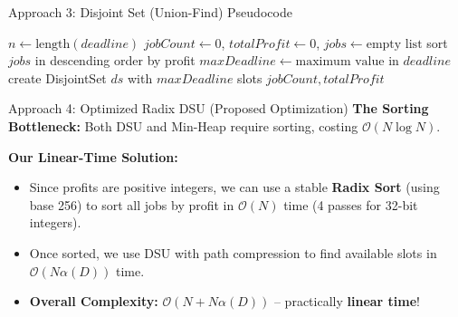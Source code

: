 \documentclass[aspectratio=169]{beamer}
\begin{document}
\begin{frame}{Approach 3: Disjoint Set (Union-Find) Pseudocode}
    \begin{algorithm}[H]
    \scriptsize
    \caption{DSU Greedy}
    \SetAlgoLined
    $n \leftarrow \text{length}(deadline)$\;
    $jobCount \leftarrow 0$, $totalProfit \leftarrow 0$, $jobs \leftarrow \text{empty list}$\;
    sort $jobs$ in descending order by profit\;
    $maxDeadline \leftarrow \text{maximum value in } deadline$\;
    create DisjointSet $ds$ with $maxDeadline$ slots\;
    \Return $jobCount, totalProfit$\;
    \end{algorithm}
\end{frame}

\begin{frame}{Approach 4: Optimized Radix DSU (Proposed Optimization)}
    \textbf{The Sorting Bottleneck:}
    Both DSU and Min-Heap require sorting, costing $\mathcal{O}(N \log N)$.
    \vspace{0.3cm}

    \textbf{Our Linear-Time Solution:}
    \begin{itemize}
        \item Since profits are positive integers, we can use a stable \textbf{Radix Sort} (using base 256) to sort all jobs by profit in $\mathcal{O}(N)$ time (4 passes for 32-bit integers).
        \item Once sorted, we use DSU with path compression to find available slots in $\mathcal{O}(N \alpha(D))$ time.
        \item \textbf{Overall Complexity:} $\mathcal{O}(N + N \alpha(D))$ -- practically \textbf{linear time}!
    \end{itemize}
\end{frame}
\end{document}
